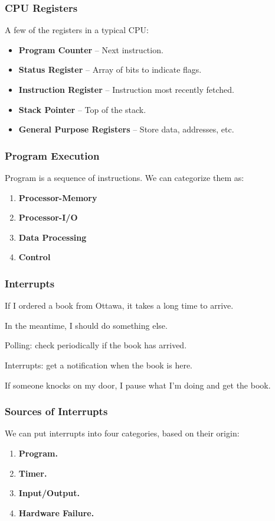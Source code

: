 \begin{frame}
\frametitle{CPU Registers}

A few of the registers in a typical CPU:

\begin{itemize}
	\item \textbf{Program Counter} -- Next instruction.
	\item \textbf{Status Register} -- Array of bits to indicate flags.
	\item \textbf{Instruction Register} -- Instruction most recently fetched.
	\item \textbf{Stack Pointer} -- Top of the stack.
	\item \textbf{General Purpose Registers} -- Store data, addresses, etc.
\end{itemize}


\end{frame}


\begin{frame}
\frametitle{Program Execution}

Program is a sequence of instructions. We can categorize them as:

\begin{enumerate}
	\item \textbf{Processor-Memory}
	\item \textbf{Processor-I/O}
	\item \textbf{Data Processing}
	\item \textbf{Control} 
\end{enumerate}

\end{frame}

\begin{frame}
\frametitle{Interrupts}

If I ordered a book from Ottawa, it takes a long time to arrive.

In the meantime, I should do something else.

Polling: check periodically if the book has arrived.

Interrupts: get a notification when the book is here.

If someone knocks on my door, I pause what I'm doing and get the book.


\end{frame}

\begin{frame}
\frametitle{Sources of Interrupts}

We can put interrupts into four categories, based on their origin:

\begin{enumerate}
	\item \textbf{Program.}
	\item \textbf{Timer.}
	\item \textbf{Input/Output.}
	\item \textbf{Hardware Failure.}
\end{enumerate}


\end{frame}

